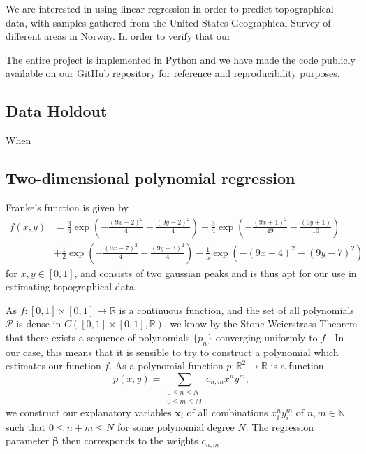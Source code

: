 \documentclass{article}
\begin{document}
We are interested in using linear regression in order to predict topographical data, with samples gathered from the United States Geographical Survey of different areas in Norway. In order to verify that our

The entire project is implemented in Python and we have made the code publicly available on \href{https://github.com/augustfe/FYSSTK/tree/main/Project1}{our GitHub repository} for reference and reproducibility purposes.

\subsection{Data Holdout}
When 

\subsection{Two-dimensional polynomial regression}
Franke's function is given by
\begin{equation*}
    \begin{split}
        f(x,y) & = \frac{3}{4}\exp\left(-\frac{(9x-2)^2}{4} - \frac{(9y-2)^2}{4}\right) + \frac{3}{4}\exp\left(-\frac{(9x+1)^2}{49} - \frac{(9y+1)}{10}\right) \\
        & + \frac{1}{2}\exp\left(-\frac{(9x-7)^2}{4} - \frac{(9y-3)^2}{4}\right) - \frac{1}{5}\exp\left(-(9x-4)^2 - (9y-7)^2\right)
    \end{split}
\end{equation*}
for $x, y \in [0, 1]$, and consists of two gaussian peaks and is thus apt for our use in estimating topographical data.

As $f: [0,1] \times [0, 1] \to \mathbb{R}$ is a continuous function, and the set of all polynomials $\mathcal{P}$ is dense in $C([0,1] \times [0,1], \mathbb{R})$, we know by the Stone-Weierstrass Theorem that there exists a sequence of polynomials $\{p_n\}$ converging uniformly to $f$ \cite[p.~116--129]{lindstrom2017spaces}. In our case, this means that it is sensible to try to construct a polynomial which estimates our function $f$. As a polynomial function $p: \mathbb{R}^2 \to \mathbb{R}$ is a function
\begin{equation*}
    p(x,y) = \sum_{\substack{0 \leq n \leq N \\ 0 \leq m \leq M}} c_{n,m} x^n y^m,
\end{equation*}
we construct our explanatory variables $\boldsymbol{x}_i$ of all combinations $x_i^n y_i^m$ of $n,m \in \mathbb{N}$ such that $0 \leq n + m \leq N$ for some polynomial degree $N$. The regression parameter $\boldsymbol{\beta}$ then corresponds to the weights $c_{n,m}$.
\end{document}
